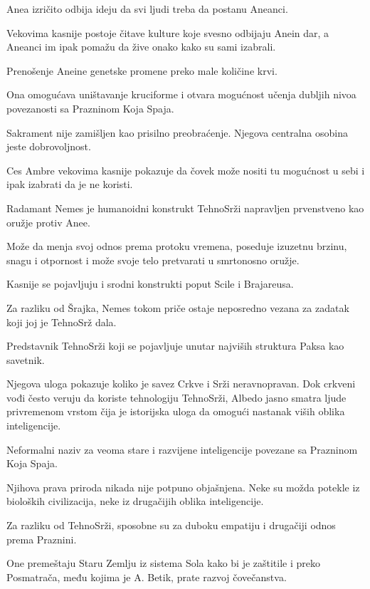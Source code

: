 \begin{description}
  Anea izričito odbija ideju da svi ljudi treba da postanu Aneanci.

  Vekovima kasnije postoje čitave kulture koje svesno odbijaju Anein dar, a Aneanci im ipak pomažu da žive onako kako su sami izabrali.


  \item[Anein sakrament]
  Prenošenje Aneine genetske promene preko male količine krvi.

  Ona omogućava uništavanje kruciforme i otvara mogućnost učenja dubljih nivoa povezanosti sa Prazninom Koja Spaja.

  Sakrament nije zamišljen kao prisilno preobraćenje. Njegova centralna osobina jeste dobrovoljnost.

  Ces Ambre vekovima kasnije pokazuje da čovek može nositi tu mogućnost u sebi i ipak izabrati da je ne koristi.


  \item[Nemes]
  Radamant Nemes je humanoidni konstrukt TehnoSrži napravljen prvenstveno kao oružje protiv Anee.

  Može da menja svoj odnos prema protoku vremena, poseduje izuzetnu brzinu, snagu i otpornost i može svoje telo pretvarati u smrtonosno oružje.

  Kasnije se pojavljuju i srodni konstrukti poput Scile i Brajareusa.

  Za razliku od Šrajka, Nemes tokom priče ostaje neposredno vezana za zadatak koji joj je TehnoSrž dala.


  \item[Albedo]
  Predstavnik TehnoSrži koji se pojavljuje unutar najviših struktura Paksa kao savetnik.

  Njegova uloga pokazuje koliko je savez Crkve i Srži neravnopravan. Dok crkveni vođi često veruju da koriste tehnologiju TehnoSrži, Albedo jasno smatra ljude privremenom vrstom čija je istorijska uloga da omogući nastanak viših oblika inteligencije.


  \item[Lavovi, Tigrovi i Medvedi]
  Neformalni naziv za veoma stare i razvijene inteligencije povezane sa Prazninom Koja Spaja.

  Njihova prava priroda nikada nije potpuno objašnjena. Neke su možda potekle iz bioloških civilizacija, neke iz drugačijih oblika inteligencije.

  Za razliku od TehnoSrži, sposobne su za duboku empatiju i drugačiji odnos prema Praznini.

  One premeštaju Staru Zemlju iz sistema Sola kako bi je zaštitile i preko Posmatrača, među kojima je A. Betik, prate razvoj čovečanstva.



\end{description}
